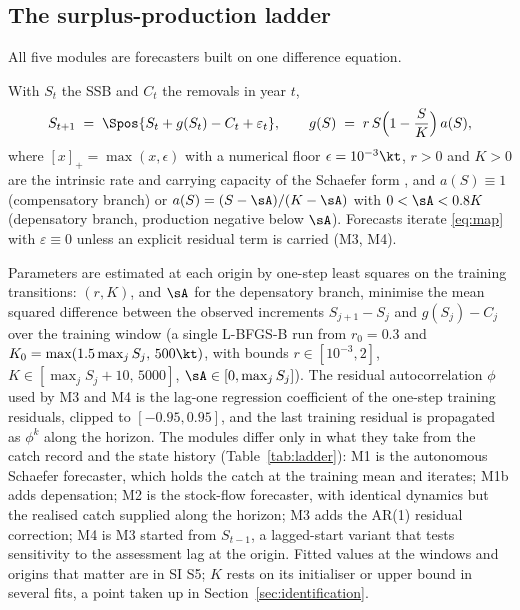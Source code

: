\subsection{The surplus-production ladder}\label{sec:ladder}

All five modules are forecasters built on one difference equation.

\begin{definition}\label{def:map}
With $S_t$ the SSB and $C_t$ the removals in year $t$,
\begin{equation}\label{eq:map}
S_{t+1} \;=\; \Spos{S_t + g(S_t) - C_t + \varepsilon_t}, \qquad
g(S) \;=\; r\,S\Bigl(1-\frac{S}{K}\Bigr)\,a(S),
\end{equation}
where $[x]_+ = \max(x,\epsilon)$ with a numerical floor $\epsilon = 10^{-3}\kt$, $r>0$ and $K>0$ are the intrinsic rate and carrying capacity of the Schaefer form \citep{Schaefer1954,Pella1969}, and $a(S)\equiv 1$ (compensatory branch) or $a(S) = (S-\sA)/(K-\sA)$ with $0<\sA<0.8K$ (depensatory branch, production negative below $\sA$). Forecasts iterate \eqref{eq:map} with $\varepsilon\equiv 0$ unless an explicit residual term is carried (M3, M4).
\end{definition}

Parameters are estimated at each origin by one-step least squares on the training transitions: $(r,K)$, and $\sA$ for the depensatory branch, minimise the mean squared difference between the observed increments $S_{j+1}-S_j$ and $g(S_j)-C_j$ over the training window (a single L-BFGS-B run from $r_0=0.3$ and $K_0=\max(1.5\max_j S_j,\,500\kt)$, with bounds $r\in[10^{-3},2]$, $K\in[\max_j S_j+10,\,5000]$, $\sA\in[0,\max_j S_j]$). The residual autocorrelation $\phi$ used by M3 and M4 is the lag-one regression coefficient of the one-step training residuals, clipped to $[-0.95,0.95]$, and the last training residual is propagated as $\phi^k$ along the horizon. The modules differ only in what they take from the catch record and the state history (Table~\ref{tab:ladder}): M1 is the autonomous Schaefer forecaster, which holds the catch at the training mean and iterates; M1b adds depensation; M2 is the stock-flow forecaster, with identical dynamics but the realised catch supplied along the horizon; M3 adds the AR(1) residual correction; M4 is M3 started from $S_{t-1}$, a lagged-start variant that tests sensitivity to the assessment lag at the origin. Fitted values at the windows and origins that matter are in SI S5; $K$ rests on its initialiser or upper bound in several fits, a point taken up in Section~\ref{sec:identification}.

